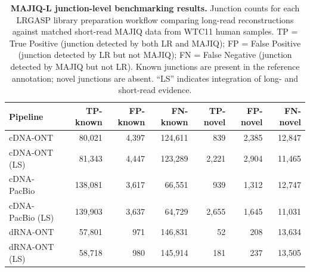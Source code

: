 {  %
  \begin{table}[htbp]
      \centering
      \caption{\textbf{MAJIQ-L junction-level benchmarking results.} Junction counts for each LRGASP library preparation workflow comparing long-read reconstructions against matched short-read MAJIQ data from WTC11 human samples. TP = True Positive (junction detected by both LR and MAJIQ); FP = False Positive (junction detected by LR but not MAJIQ); FN = False Negative (junction detected by MAJIQ but not LR). Known junctions are present in the reference annotation; novel junctions are absent. ``LS'' indicates integration of long- and short-read evidence.}
      \label{tab:2}
      {\footnotesize
      \begin{tabular*}{\textwidth}{@{\extracolsep{\fill}}lrrrrrr@{}}
          \toprule
          Pipeline & TP-known & FP-known & FN-known & TP-novel & FP-novel & FN-novel \\
          \midrule
          cDNA-ONT & 80,021 & 4,397 & 124,611 & 839 & 2,385 & 12,847 \\
          cDNA-ONT (LS) & 81,343 & 4,447 & 123,289 & 2,221 & 2,904 & 11,465 \\
          cDNA-PacBio & 138,081 & 3,617 & 66,551 & 939 & 1,312 & 12,747 \\
          cDNA-PacBio (LS) & 139,903 & 3,637 & 64,729 & 2,655 & 1,645 & 11,031 \\
          dRNA-ONT & 57,801 & 971 & 146,831 & 52 & 208 & 13,634 \\
          dRNA-ONT (LS) & 58,718 & 980 & 145,914 & 181 & 237 & 13,505 \\
          \bottomrule
      \end{tabular*}
      }
  \end{table}

}
